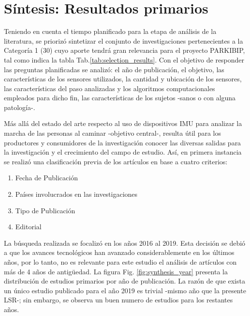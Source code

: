 \section{Síntesis: Resultados primarios}\label{synthesis}

Teniendo en cuenta el tiempo planificado para la etapa de análisis de la literatura, se priorizó sintetizar el conjunto de investigaciones pertenecientes a la Categoría 1 (30) cuyo aporte tendrá gran relevancia para el proyecto PARKIBIP, tal como indica la tabla Tab.\ref{tab:selection_results}. Con el objetivo de responder las preguntas planificadas se analizó: el año de publicación, el objetivo, las características de los sensores utilizados, la cantidad y ubicación de los sensores, las características del paso analizadas y los algoritmos computacionales empleados para dicho fin, las características de los sujetos -sanos o con alguna patología-.

Más allá del estado del arte respecto al uso de dispositivos IMU para analizar la marcha de las personas al caminar -objetivo central-, resulta útil para los productores y consumidores de la investigación conocer las diversas salidas para la investigación y el crecimiento del campo de estudio. Así, en primera instancia se realizó una clasificación previa de los artículos en base a cuatro criterios:
\begin{enumerate}
    \item Fecha de Publicación
    \item Países involucrados en las investigaciones
    \item Tipo de Publicación
    \item Editorial
\end{enumerate}

La búsqueda realizada se focalizó en los años 2016 al 2019. Esta decisión se debió a que los avances tecnológicos han avanzado considerablemente en los últimos años, por lo tanto, no es relevante para este estudio el análisis de artículos con más de 4 años de antigüedad.
La figura Fig. \ref{fig:synthesis_year} presenta la distribución de estudios primarios por año de publicación. La razón de que exista un único estudio publicado para el año 2019 es trivial -mismo año que la presente LSR-; sin embargo, se observa un buen numero de estudios para los restantes años.

